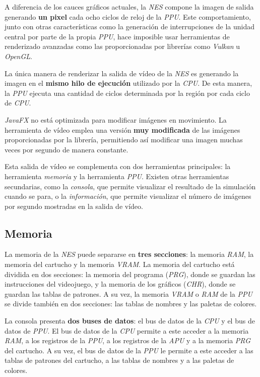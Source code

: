 A diferencia de los cauces gráficos actuales, la \textit{NES}
compone la imagen de salida generando \textbf{un pixel} cada
ocho ciclos de reloj de la \textit{PPU}.
Este comportamiento, junto con otras características como
la generación de interrupciones de la unidad central
por parte de la propia \textit{PPU}, hace imposible usar
herramientas de renderizado avanzadas como las proporcionadas
por librerías como \textit{Vulkan} u \textit{OpenGL}.

La única manera de renderizar la salida de vídeo de la \textit{NES}
es generando la imagen en el \textbf{mismo hilo de ejecución}
utilizado por la \textit{CPU}.
De esta manera, la \textit{PPU} ejecuta una cantidad de ciclos
determinada por la región por cada ciclo de \textit{CPU}.

\textit{JavaFX} no está optimizada para modificar imágenes en movimiento.
La herramienta de vídeo emplea una versión \textbf{muy modificada}
de las imágenes proporcionadas por la librería,
permitiendo así modificar una imagen muchas veces por segundo
de manera constante.

Esta salida de vídeo se complementa con dos herramientas principales:
la herramienta \textit{memoria} y la herramienta \textit{PPU}.
Existen otras herramientas secundarias, como la \textit{consola}, que permite
visualizar el resultado de la simulación cuando se para, o
la \textit{información}, que permite visualizar el número de imágenes por segundo
mostradas en la salida de vídeo.

\subsection{Memoria}\label{subsec:memoria}

La memoria de la \textit{NES} puede separarse en \textbf{tres secciones}:
la memoria \textit{RAM}, la memoria del cartucho y la memoria \textit{VRAM}.
La memoria del cartucho está dividida en dos secciones:
la memoria del programa (\textit{PRG}), donde se guardan
las instrucciones del videojuego,
y la memoria de los gráficos (\textit{CHR}), donde se guardan
las tablas de patrones.
A su vez, la memoria \textit{VRAM} o \textit{RAM} de la \textit{PPU}
se divide también en dos secciones:
las tablas de nombres y las paletas de colores.

La consola presenta \textbf{dos buses de datos}:
el bus de datos de la \textit{CPU}
y el bus de datos de \textit{PPU}.
El bus de datos de la \textit{CPU} permite a
este acceder a la memoria \textit{RAM},
a los registros de la \textit{PPU},
a los registros de la \textit{APU}
y a la memoria \textit{PRG} del cartucho.
A su vez, el bus de datos de la \textit{PPU}
le permite a este acceder a las tablas de patrones
del cartucho, a las tablas de nombres y a las paletas
de colores.

